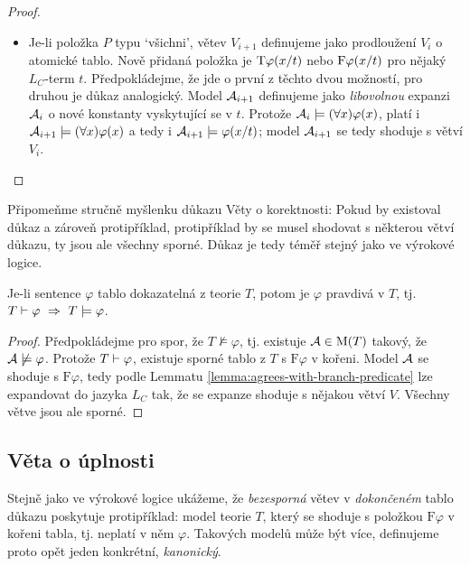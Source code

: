 \begin{proof}
\begin{itemize}
\begin{itemize}
            \item Je-li položka $P$ typu `všichni', větev $V_{i+1}$ definujeme jako prodloužení $V_i$ o atomické tablo. Nově přidaná položka je $\mathrm{T}\varphi(x/t)$ nebo $\mathrm{F}\varphi(x/t)$ pro nějaký $L_C$-term $t$. Předpokládejme, že jde o první z těchto dvou možností, pro druhou je důkaz analogický. 
            Model $\mathcal{A}_{i+1}$ definujeme jako \emph{libovolnou} expanzi $\mathcal{A}_i$ o nové konstanty vyskytující se v $t$.    
            Protože $\mathcal{A}_i\models(\forall x)\varphi(x)$, platí i $\mathcal{A}_{i+1}\models(\forall x)\varphi(x)$ a tedy i $\mathcal{A}_{i+1}\models\varphi(x/t)$; model $\mathcal{A}_{i+1}$ se tedy shoduje s větví $V_i$.
        \end{itemize}       
    \end{itemize}
\end{proof}

Připomeňme stručně myšlenku důkazu Věty o korektnosti: Pokud by existoval důkaz a zároveň protipříklad, protipříklad by se musel shodovat s některou větví důkazu, ty jsou ale všechny sporné. Důkaz je tedy téměř stejný jako ve výrokové logice.

\begin{theorem}[O korektnosti]
Je-li sentence $\varphi$ tablo dokazatelná z teorie $T$, potom je $\varphi$ pravdivá v $T$, tj. $T\proves\varphi\ \Rightarrow\ T\models\varphi$.    
\end{theorem}

\begin{proof}
Předpokládejme pro spor, že $T\not\models\varphi$, tj. existuje $\mathcal{A}\in\operatorname{M}(T)$ takový, že $\mathcal{A}\not\models\varphi$. Protože $T\vdash\varphi$,  existuje sporné tablo z $T$ s $\mathrm{F}\varphi$ v kořeni. Model $\mathcal{A}$ se shoduje s $\mathrm{F}\varphi$, tedy podle Lemmatu \ref{lemma:agrees-with-branch-predicate} lze expandovat do jazyka $L_C$ tak, že se expanze shoduje s nějakou větví $V$. Všechny větve jsou ale sporné.
\end{proof}

\subsection{Věta o úplnosti}

Stejně jako ve výrokové logice ukážeme, že \emph{bezesporná} větev v \emph{dokončeném} tablo důkazu poskytuje protipříklad: model teorie $T$, který se shoduje s položkou $\mathrm{F}\varphi$ v kořeni tabla, tj. neplatí v něm $\varphi$. Takových modelů může být více, definujeme proto opět jeden konkrétní, \emph{kanonický}.

